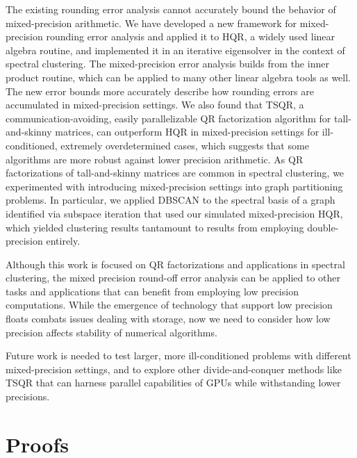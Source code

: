 \documentclass[review,onefignum,onetabnum]{siamart190516}
\begin{document}
The existing rounding error analysis cannot accurately bound the behavior of mixed-precision arithmetic.
We have developed a new framework for mixed-precision rounding error analysis and applied it to HQR, a widely used linear algebra routine, and implemented it in an iterative eigensolver in the context of spectral clustering. 
The mixed-precision error analysis builds from the inner product routine, which can be applied to many other linear algebra tools as well.
The new error bounds more accurately describe how rounding errors are accumulated in mixed-precision settings.
We also found that TSQR, a communication-avoiding, easily parallelizable QR factorization algorithm for tall-and-skinny matrices, can outperform HQR in mixed-precision settings for ill-conditioned, extremely overdetermined cases, which suggests that some algorithms are more robust against lower precision arithmetic.
As QR factorizations of tall-and-skinny matrices are common in spectral clustering, we experimented with introducing mixed-precision settings into graph partitioning problems.
In particular, we applied DBSCAN to the spectral basis of a graph identified via subspace iteration that used our simulated mixed-precision HQR, which yielded clustering results tantamount to results from employing double-precision entirely.\par

Although this work is focused on QR factorizations and applications in spectral clustering, the mixed precision round-off error analysis can be applied to other tasks and applications that can benefit from employing low precision computations. 
While the emergence of technology that support low precision floats combats issues dealing with storage, now we need to consider how low precision affects stability of numerical algorithms. 

Future work is needed to test larger, more ill-conditioned problems with different mixed-precision settings, and to explore other divide-and-conquer methods like TSQR that can harness parallel capabilities of GPUs while withstanding lower precisions. 

\appendix
\section{Proofs}

\label{appendix:A}

\end{document}
